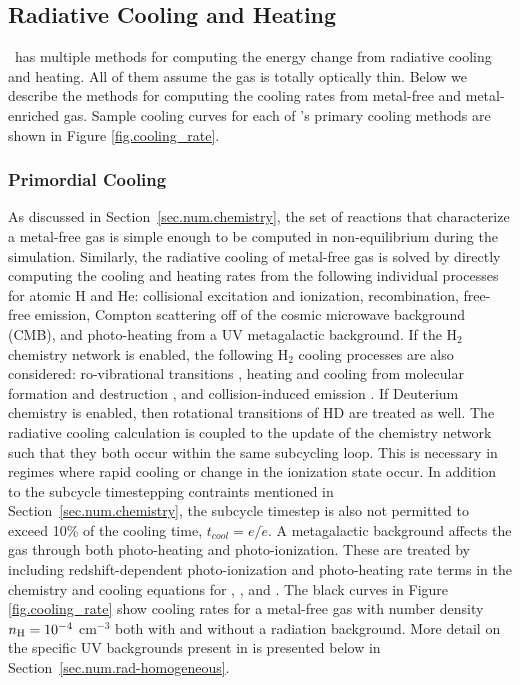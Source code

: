 \subsection{Radiative Cooling and Heating}
\label{sec.num.cooling}

\enzo\ has multiple methods for computing the energy change from
radiative cooling and heating.  All of them assume the gas is totally
optically thin.  Below we describe the methods for computing the
cooling rates from metal-free and metal-enriched gas.  Sample cooling
curves for each of \enzo's primary cooling methods are shown in Figure
\ref{fig.cooling_rate}.

\subsubsection{Primordial Cooling}

As discussed in Section~\ref{sec.num.chemistry}, the set of reactions that
characterize a metal-free gas is simple enough to be computed in
non-equilibrium during the simulation.  Similarly, the radiative
cooling of metal-free gas is solved by directly computing the cooling
and heating rates from the following individual processes for atomic H
and He: collisional excitation and ionization, recombination,
free-free emission, Compton scattering off of the cosmic microwave
background (CMB), and photo-heating from a UV metagalactic background.
If the H$_{2}$ chemistry network is enabled, the following H$_{2}$
cooling processes are also considered: ro-vibrational transitions
\citep{1998A&A...335..403G}, heating and cooling from molecular
formation and destruction \citep{2009Sci...325..601T}, and
collision-induced emission \citep{2004MNRAS.348.1019R}.  If Deuterium
chemistry is enabled, then rotational transitions of HD
\citep{1998A&A...335..403G} are treated as well.  The radiative
cooling calculation is coupled to the update of the chemistry network
such that they both occur within the same subcycling loop.  This is
necessary in regimes where rapid cooling or change in the ionization
state occur.  In addition to the subcycle timestepping contraints
mentioned in Section~\ref{sec.num.chemistry}, the subcycle timestep is also not
permitted to exceed 10\% of the cooling time, $t_{cool} = e/\dot{e}$.  A
metagalactic background affects the gas through both photo-heating and
photo-ionization.  These are treated by including redshift-dependent
photo-ionization and photo-heating rate terms in the chemistry and
cooling equations for , , and .  The
black curves in Figure \ref{fig.cooling_rate} show cooling rates for a
metal-free gas with number density $n_{\rm H} = 10^{-4}$ cm$^{-3}$ both
with and without a radiation background.  More detail on the specific
UV backgrounds present in \enzo is presented below in
Section~\ref{sec.num.rad-homogeneous}.

